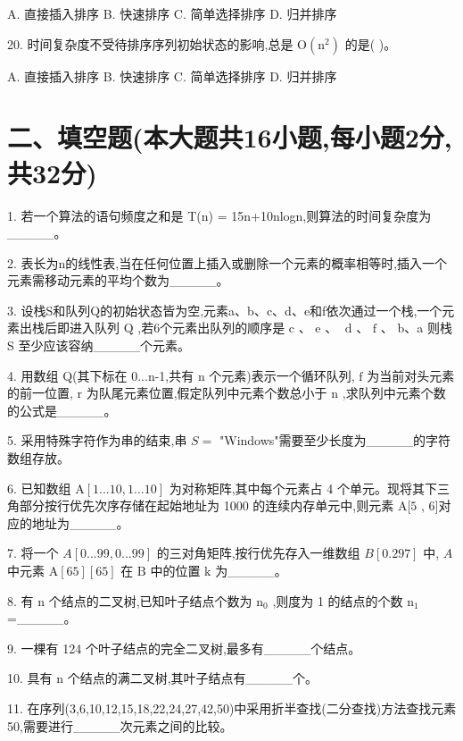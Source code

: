 A. 直接插入排序 B. 快速排序 C. 简单选择排序 D. 归并排序

20. 时间复杂度不受待排序序列初始状态的影响,总是 \(\mathrm{O}\left( {\mathrm{n}}^{2}\right)\) 的是(   )。

A. 直接插入排序 B. 快速排序 C. 简单选择排序 D. 归并排序

\section*{二、填空题(本大题共16小题,每小题2分,共32分)}

1. 若一个算法的语句频度之和是 T(n) = 15n+10nlogn,则算法的时间复杂度为\_\_\_\_\_。  

2. 表长为n的线性表,当在任何位置上插入或删除一个元素的概率相等时,插入一个元素需移动元素的平均个数为\_\_\_\_\_。  

3. 设栈S和队列Q的初始状态皆为空,元素a、b、c、d、e和f依次通过一个栈,一个元素出栈后即进入队列 \(\mathrm{Q}\) ,若6个元素出队列的顺序是 \(\mathrm{c}\text{ 、 }\mathrm{e}\text{ 、 }\mathrm{\;d}\text{ 、 }\mathrm{f}\) 、 b、a 则栈 S 至少应该容纳\_\_\_\_\_个元素。

4. 用数组 Q(其下标在 0...n-1,共有 n 个元素)表示一个循环队列, \(\mathrm{f}\) 为当前对头元素的前一位置, \(\mathrm{r}\) 为队尾元素位置,假定队列中元素个数总小于 \(\mathrm{n}\) ,求队列中元素个数的公式是\_\_\_\_\_。

5. 采用特殊字符作为串的结束,串 \(S =\) "Windows"需要至少长度为\_\_\_\_\_的字符数组存放。

6. 已知数组 \(\mathrm{A}\left\lbrack  {{1...10},{1...10}}\right\rbrack\) 为对称矩阵,其中每个元素占 4 个单元。现将其下三角部分按行优先次序存储在起始地址为 1000 的连续内存单元中,则元素 \(\mathrm{A}\lbrack 5\) , 6]对应的地址为\_\_\_\_\_。

7. 将一个 \(A\left\lbrack  {{0...99},{0...99}}\right\rbrack\) 的三对角矩阵,按行优先存入一维数组 \(B\left\lbrack  {0.297}\right\rbrack\) 中, \(A\) 中元素 \(\mathrm{A}\left\lbrack  {65}\right\rbrack  \left\lbrack  {65}\right\rbrack\) 在 \(\mathrm{B}\) 中的位置 \(\mathrm{k}\) 为\_\_\_\_\_。

8. 有 \(\mathrm{n}\) 个结点的二叉树,已知叶子结点个数为 \({\mathrm{n}}_{0}\) ,则度为 1 的结点的个数 \({\mathrm{n}}_{1}\) =\_\_\_\_\_。

9. 一棵有 124 个叶子结点的完全二叉树,最多有\_\_\_\_\_个结点。

10. 具有 n 个结点的满二叉树,其叶子结点有\_\_\_\_\_个。

11. 在序列(3,6,10,12,15,18,22,24,27,42,50)中采用折半查找(二分查找)方法查找元素 50,需要进行\_\_\_\_\_次元素之间的比较。

